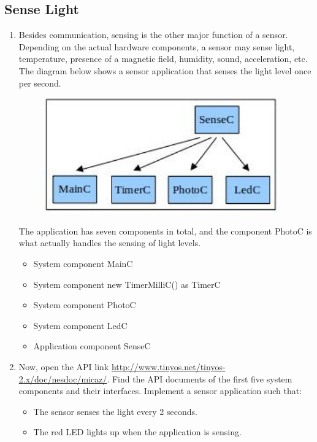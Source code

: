 \documentclass[letterpaper,12pt]{article}
\begin{document}
\subsection*{Sense Light}
\begin{enumerate}
    \item Besides communication, sensing is the other major function of a sensor.
          Depending on the actual hardware components, a sensor may sense light,
          temperature, presence of a magnetic field, humidity, sound, acceleration,
          etc. The diagram below shows a sensor application that senses the light
          level once per second.
        \begin{figure}[H]
            \centering
            \includegraphics[width=4in]{diagram1.jpg}
        \end{figure}
         The application has seven components in total, and the component
         PhotoC is what actually handles the sensing of light levels.
        \begin{itemize}
            \item System component MainC
            \item System component new TimerMilliC() as TimerC
            \item System component PhotoC
            \item System component LedC
            \item Application component SenseC
        \end{itemize}
    \item Now, open the API link \url{http://www.tinyos.net/tinyos-2.x/doc/nesdoc/micaz/}.
          Find the API documents of the first five system components and their
          interfaces. Implement a sensor application such that:
          \begin{itemize}
            \item The sensor senses the light every 2 seconds.
            \item The red LED lights up when the application is sensing.

\end{itemize}
\end{enumerate}
\end{document}
